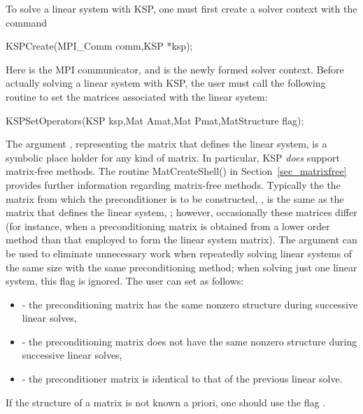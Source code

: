 To solve a linear system with KSP, one must first create a solver context
with the command
\begin{tabbing}
  KSPCreate(MPI\_Comm comm,KSP *ksp);
\end{tabbing}
Here  is the MPI communicator, and  is the newly
formed solver context.
Before actually solving a linear system with KSP, the user must call
the following routine to set the matrices associated with the linear
system:
\begin{tabbing}
  KSPSetOperators(KSP ksp,Mat Amat,Mat Pmat,MatStructure flag);
\end{tabbing}
The argument , representing the matrix that defines the
linear system, is a symbolic place holder for any kind of matrix.
In particular, KSP {\em does} support matrix-free methods.
The routine MatCreateShell()
in Section~\ref{sec_matrixfree} provides further information regarding
matrix-free methods.
Typically the the matrix from which the
preconditioner is to be constructed, , is the same as
the matrix that defines the linear system, ; however,
occasionally these matrices differ (for instance, 
when a preconditioning matrix is obtained from a lower order method than
that employed to form the linear system matrix).
The argument  can be used to eliminate unnecessary work when
repeatedly solving linear systems of the same size with the same
preconditioning method; when solving just one linear system, this flag is
ignored.  The user can set  as follows:
\begin{itemize}
\item {} - the preconditioning matrix has the
    same  nonzero structure during successive
    linear solves,
\item {} - the preconditioning matrix does
     not have the same nonzero structure during successive linear solves,
\item {} - the preconditioner matrix is identical
   to that of the previous linear solve. 
\end{itemize}
If the structure of a matrix is not known a priori, one should use
the flag .

